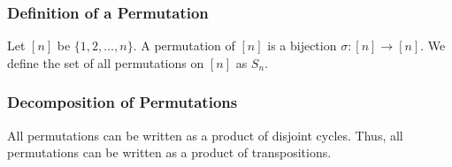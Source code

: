 \documentclass[a4paper, 12pt, twoside]{article}
\begin{document}
\subsubsection{Definition of a Permutation}

Let $[n]$ be $\{1, 2, \ldots, n\}$. A permutation of $[n]$ is a bijection
$\sigma : [n] \to [n]$. We define the set of all permutations on $[n]$ as
$S_n$.

\subsubsection{Decomposition of Permutations}

All permutations can be written as a product of disjoint cycles. Thus,
all permutations can be written as a product of transpositions.
\end{document}
